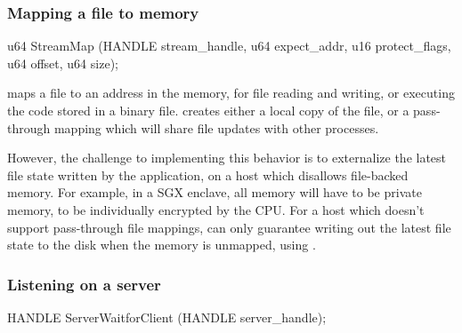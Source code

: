


\subsubsection*{Mapping a file to memory}
                   
\begin{paldef}            
u64 StreamMap (HANDLE stream_handle, u64 expect_addr,
               u16 protect_flags, u64 offset, u64 size);
\end{paldef}


 maps a file to an address in the memory, for file reading and writing, or executing the code stored in a binary file.
 creates either a local copy of the file,
or a pass-through mapping
which will share file updates with other processes. %





However, the challenge to implementing this behavior
is to externalize the latest file state
written by the application,
on a host which disallows file-backed memory.
For example, in a SGX enclave, all memory will have to be private memory,
to be individually encrypted by the CPU.
For a host which doesn't support pass-through file mappings,
can only guarantee writing out
the latest file state to the disk when the memory is unmapped, using .











\subsubsection*{Listening on a server}


\begin{paldef}
HANDLE ServerWaitforClient (HANDLE server_handle);
\end{paldef} 


